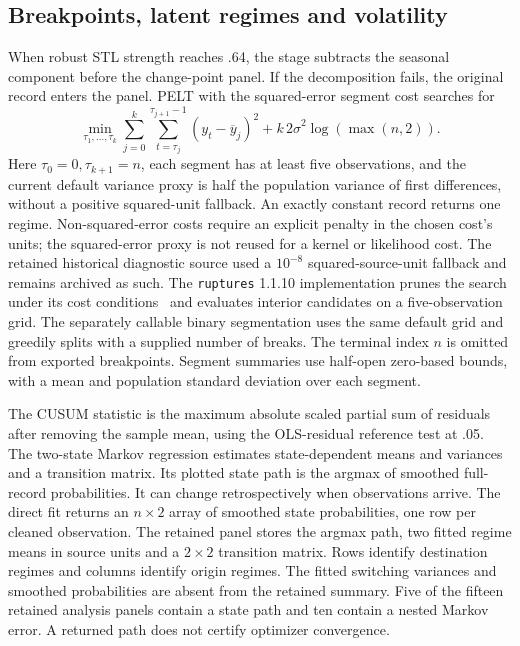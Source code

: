\subsection{Breakpoints, latent regimes and volatility}
\label{sec:diagnostic-breaks}
When robust STL strength reaches .64, the stage subtracts the seasonal component before the change-point panel. If the decomposition fails, the original record enters the panel. PELT with the squared-error segment cost searches for
\begin{equation}
 \min_{\tau_1,\ldots,\tau_k}
 \sum_{j=0}^{k}\sum_{t=\tau_j}^{\tau_{j+1}-1}(y_t-\overline y_j)^2
 + k\,2\widehat\sigma^2\log(\max(n,2)).
\end{equation}
Here $\tau_0=0,\tau_{k+1}=n$, each segment has at least five observations, and the current default variance proxy is half the population variance of first differences, without a positive squared-unit fallback. An exactly constant record returns one regime. Non-squared-error costs require an explicit penalty in the chosen cost's units; the squared-error proxy is not reused for a kernel or likelihood cost. The retained historical diagnostic source used a $10^{-8}$ squared-source-unit fallback and remains archived as such. The \texttt{ruptures} 1.1.10 implementation prunes the search under its cost conditions~\cite{pelt} and evaluates interior candidates on a five-observation grid. The separately callable binary segmentation uses the same default grid and greedily splits with a supplied number of breaks. The terminal index $n$ is omitted from exported breakpoints. Segment summaries use half-open zero-based bounds, with a mean and population standard deviation over each segment.

The CUSUM statistic is the maximum absolute scaled partial sum of residuals after removing the sample mean, using the OLS-residual reference test at .05. The two-state Markov regression estimates state-dependent means and variances and a transition matrix. Its plotted state path is the argmax of smoothed full-record probabilities. It can change retrospectively when observations arrive. The direct fit returns an $n\times 2$ array of smoothed state probabilities, one row per cleaned observation. The retained panel stores the argmax path, two fitted regime means in source units and a $2\times 2$ transition matrix. Rows identify destination regimes and columns identify origin regimes. The fitted switching variances and smoothed probabilities are absent from the retained summary. Five of the fifteen retained analysis panels contain a state path and ten contain a nested Markov error. A returned path does not certify optimizer convergence.

